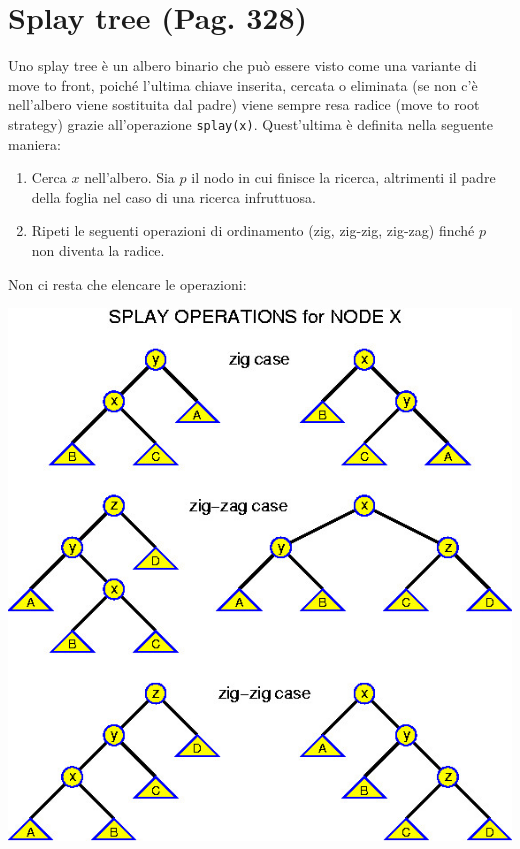 \documentclass[a4paper]{book}
\newcommand{\inline}[1]{\lstinline!#1!}%
\begin{document}
\section{Splay tree (Pag. 328)}
Uno splay tree è un albero binario che può essere visto come una variante di move to front, poiché l'ultima chiave inserita, cercata o eliminata (se non c'è nell'albero viene sostituita dal padre) viene sempre resa radice (move to root strategy) grazie all'operazione \inline{splay(x)}. Quest'ultima è definita nella seguente maniera:
\begin{enumerate}
\item Cerca $x$ nell'albero. Sia $p$ il nodo in cui finisce la ricerca, altrimenti il padre della foglia nel caso di una ricerca infruttuosa.
\item Ripeti le seguenti operazioni di ordinamento (zig, zig-zig, zig-zag) finché $p$ non diventa la radice.
\end{enumerate}
Non ci resta che elencare le operazioni:
\begin{center}
\includegraphics[scale=0.5]{Figures/splay.jpg}
\end{center}
\end{document}
